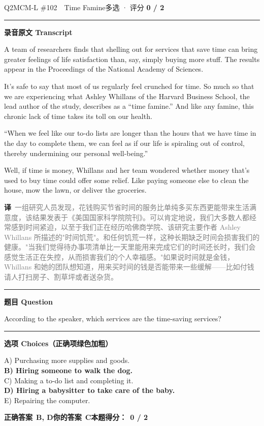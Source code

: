 \documentclass[11pt]{article}
\newcommand{\ptesub}[1]{%
  \par\needspace{2\baselineskip}\smallskip
  {\color{cAccent}\rule[-0.2ex]{3pt}{1.05em}}\hspace{6pt}%
  {\bfseries\color{cHead}#1}\par\nopagebreak\smallskip}
\newcommand{\zh}[1]{{\footnotesize\textcolor{cNote}{\textbf{译}}\ \textcolor{gray}{#1}}}
\begin{document}
\begin{qblock}{Q2\quad MCM-L \#102\ \ Time Famine}{多选 · 评分 \textcolor{cAccent}{\bfseries 0 / 2}}
\ptesub{录音原文 Transcript}
\begin{promptbox}
A team of researchers finds that shelling out for services that save time can bring greater feelings of life satisfaction than, say, simply buying more stuff. The results appear in the Proceedings of the National Academy of Sciences.

It's safe to say that most of us regularly feel crunched for time. So much so that we are experiencing what Ashley Whillans of the Harvard Business School, the lead author of the study, describes as a ``time famine.'' And like any famine, this chronic lack of time takes its toll on our health.

``When we feel like our to-do lists are longer than the hours that we have time in the day to complete them, we can feel as if our life is spiraling out of control, thereby undermining our personal well-being.''

Well, if time is money, Whillans and her team wondered whether money that's used to buy time could offer some relief. Like paying someone else to clean the house, mow the lawn, or deliver the groceries.
\end{promptbox}
\zh{一组研究人员发现，花钱购买节省时间的服务比单纯多买东西更能带来生活满意度，该结果发表于《美国国家科学院院刊》。可以肯定地说，我们大多数人都经常感到时间紧迫，以至于我们正在经历哈佛商学院、该研究主要作者 Ashley Whillans 所描述的"时间饥荒"。和任何饥荒一样，这种长期缺乏时间会损害我们的健康。"当我们觉得待办事项清单比一天里能用来完成它们的时间还长时，我们会感觉生活正在失控，从而损害我们的个人幸福感。"如果说时间就是金钱，Whillans 和她的团队想知道，用来买时间的钱是否能带来一些缓解——比如付钱请人打扫房子、割草坪或者送杂货。}
\ptesub{题目 Question}
\begin{notebox}According to the speaker, which services are the time-saving services?\end{notebox}
\ptesub{选项 Choices（正确项绿色加粗）}
{\small
A) Purchasing more supplies and goods.\\
{\color{cFix}\textbf{B) Hiring someone to walk the dog.}}\\
C) Making a to-do list and completing it.\\
{\color{cFix}\textbf{D) Hiring a babysitter to take care of the baby.}}\\
E) Repairing the computer.}
\par\smallskip
\textbf{正确答案}\ \textcolor{cFix}{\bfseries B, D}\qquad\textbf{你的答案}\ {\color{cWrong}\bfseries C}\qquad\textbf{本题得分：}\ {\color{cAccent}\bfseries 0 / 2}
\end{qblock}
\end{document}
